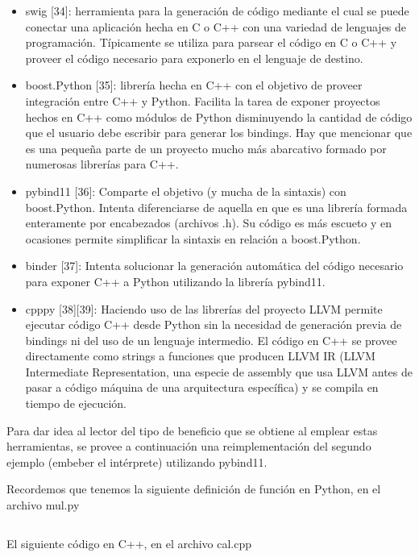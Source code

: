 \begin{itemize}
    \item swig [34]: herramienta para la generación de código mediante el cual
se puede conectar una aplicación hecha en C o C++ con una variedad de lenguajes
de programación. Típicamente se utiliza para parsear el código en C o C++ y
proveer el código necesario para exponerlo en el lenguaje de destino.

    \item boost.Python [35]: librería hecha en C++ con el objetivo de proveer
integración entre C++ y Python. Facilita la tarea de exponer proyectos hechos
en C++ como módulos de Python disminuyendo la cantidad de código que el usuario
debe escribir para generar los bindings. Hay que mencionar que es una pequeña
parte de un proyecto mucho más abarcativo formado por numerosas librerías para
C++.

    \item pybind11 [36]: Comparte el objetivo (y mucha de la sintaxis) con
boost.Python.  Intenta diferenciarse de aquella en que es una librería formada
enteramente por encabezados (archivos .h). Su código es más escueto y en
ocasiones permite simplificar la sintaxis en relación a boost.Python. 

    \item binder [37]: Intenta solucionar la generación automática del código
necesario para exponer C++ a Python utilizando la librería pybind11.

    \item cpppy [38][39]: Haciendo uso de las librerías del proyecto LLVM
permite ejecutar código C++ desde Python sin la necesidad de generación previa
de bindings ni del uso de un lenguaje intermedio. El código en C++ se provee
directamente como strings a funciones que producen LLVM IR (LLVM Intermediate
Representation, una especie de assembly que usa LLVM antes de pasar a código
máquina de una arquitectura específica) y se compila en tiempo de ejecución.
\end{itemize}

Para dar idea al lector del tipo de beneficio que se obtiene al emplear estas
herramientas, se provee a continuación una reimplementación del segundo ejemplo
(embeber el intérprete) utilizando pybind11.

Recordemos que tenemos la siguiente definición de función en Python, en el
archivo mul.py

\inputminted{Python}{codelistings/multiply.py}

El siguiente código en C++, en el archivo cal.cpp

